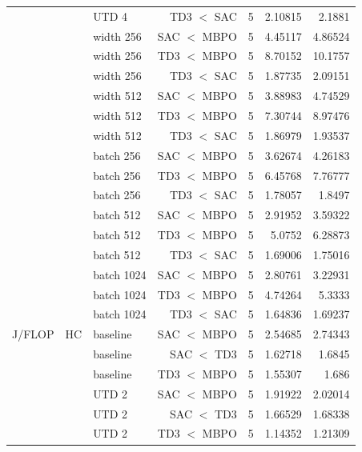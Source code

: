 {\begin{longtable}{@{}lllrrrr@{}}
     &  & UTD 4 & TD3 $<$ SAC & \num{5} & \num{2.10815} & \num{2.1881} \\
     &  & width 256 & SAC $<$ MBPO & \num{5} & \num{4.45117} & \num{4.86524} \\
     &  & width 256 & TD3 $<$ MBPO & \num{5} & \num{8.70152} & \num{10.1757} \\
     &  & width 256 & TD3 $<$ SAC & \num{5} & \num{1.87735} & \num{2.09151} \\
     &  & width 512 & SAC $<$ MBPO & \num{5} & \num{3.88983} & \num{4.74529} \\
     &  & width 512 & TD3 $<$ MBPO & \num{5} & \num{7.30744} & \num{8.97476} \\
     &  & width 512 & TD3 $<$ SAC & \num{5} & \num{1.86979} & \num{1.93537} \\
     &  & batch 256 & SAC $<$ MBPO & \num{5} & \num{3.62674} & \num{4.26183} \\
     &  & batch 256 & TD3 $<$ MBPO & \num{5} & \num{6.45768} & \num{7.76777} \\
     &  & batch 256 & TD3 $<$ SAC & \num{5} & \num{1.78057} & \num{1.8497} \\
     &  & batch 512 & SAC $<$ MBPO & \num{5} & \num{2.91952} & \num{3.59322} \\
     &  & batch 512 & TD3 $<$ MBPO & \num{5} & \num{5.0752} & \num{6.28873} \\
     &  & batch 512 & TD3 $<$ SAC & \num{5} & \num{1.69006} & \num{1.75016} \\
     &  & batch 1024 & SAC $<$ MBPO & \num{5} & \num{2.80761} & \num{3.22931} \\
     &  & batch 1024 & TD3 $<$ MBPO & \num{5} & \num{4.74264} & \num{5.3333} \\
     &  & batch 1024 & TD3 $<$ SAC & \num{5} & \num{1.64836} & \num{1.69237} \\
    \midrule
    J/FLOP & HC & baseline & SAC $<$ MBPO & \num{5} & \num{2.54685} & \num{2.74343} \\
     &  & baseline & SAC $<$ TD3 & \num{5} & \num{1.62718} & \num{1.6845} \\
     &  & baseline & TD3 $<$ MBPO & \num{5} & \num{1.55307} & \num{1.686} \\
     &  & UTD 2 & SAC $<$ MBPO & \num{5} & \num{1.91922} & \num{2.02014} \\
     &  & UTD 2 & SAC $<$ TD3 & \num{5} & \num{1.66529} & \num{1.68338} \\
     &  & UTD 2 & TD3 $<$ MBPO & \num{5} & \num{1.14352} & \num{1.21309} \\

\end{longtable}}
